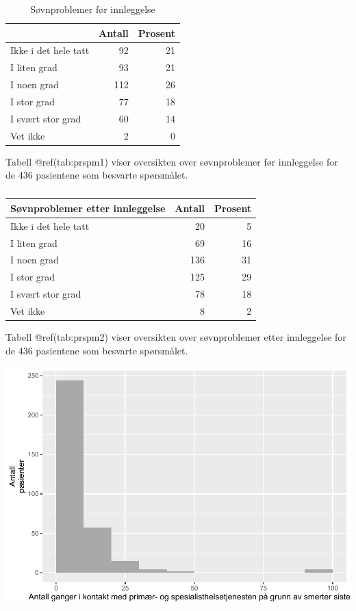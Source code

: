 \documentclass[
]{article}
\begin{document}
\begin{table}

\caption{\label{tab:prspm1}Søvnproblemer før innleggelse}
\centering
\begin{tabular}[t]{l|r|r}
\hline
 & Antall  & Prosent\\
\hline
Ikke i det hele tatt & 92 & 21\\
\hline
I liten grad & 93 & 21\\
\hline
I noen grad & 112 & 26\\
\hline
I stor grad & 77 & 18\\
\hline
I svært stor grad & 60 & 14\\
\hline
Vet ikke & 2 & 0\\
\hline
\end{tabular}
\end{table}

Tabell @ref(tab:prspm1) viser oversikten over søvnproblemer før
innleggelse for de 436 pasientene som besvarte spørsmålet.

\begin{table}

\caption{\label{tab:prspm2}}
\centering
\begin{tabular}[t]{l|r|r}
\hline
Søvnproblemer etter innleggelse & Antall  & Prosent\\
\hline
Ikke i det hele tatt & 20 & 5\\
\hline
I liten grad & 69 & 16\\
\hline
I noen grad & 136 & 31\\
\hline
I stor grad & 125 & 29\\
\hline
I svært stor grad & 78 & 18\\
\hline
Vet ikke & 8 & 2\\
\hline
\end{tabular}
\end{table}

Tabell @ref(tab:prspm2) viser oversikten over søvnproblemer etter
innleggelse for de 436 pasientene som besvarte spørsmålet.

\includegraphics{lokalEpromNy_files/figure-latex/kontaktfig-1.pdf}
\end{document}
